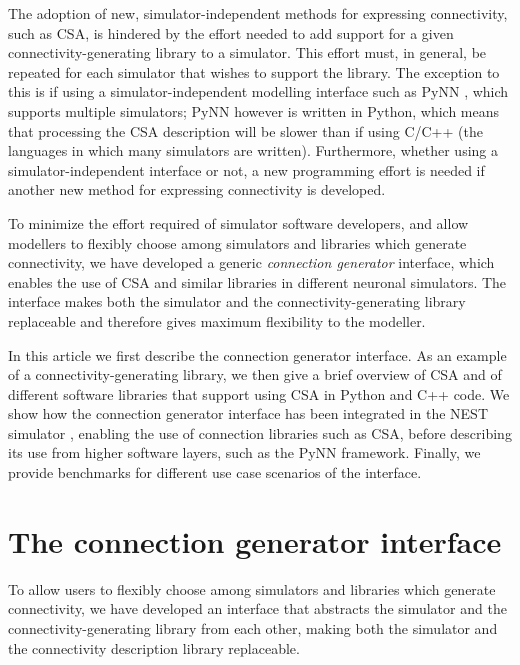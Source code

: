 \documentclass{frontiersSCNS} %
\begin{document}
The adoption of new, simulator-independent methods for expressing
connectivity, such as CSA, is hindered by the effort needed to add
support for a given connectivity-generating library to a simulator.
This effort must, in general, be repeated for each simulator that
wishes to support the library.  The exception to this is if using a
simulator-independent modelling interface such as PyNN
\citep[\url{http://www.neuralensemble.org/PyNN};][]{Davison09}, which
supports multiple simulators; PyNN however is written in Python, which
means that processing the CSA description will be slower than if using
C/C++ (the languages in which many simulators are written).
Furthermore, whether using a simulator-independent interface or not, a
new programming effort is needed if another new method for expressing
connectivity is developed.

To minimize the effort required of simulator software developers, and
allow modellers to flexibly choose among simulators and libraries
which generate connectivity, we have developed a generic
\emph{connection generator} interface, which enables the use of CSA
and similar libraries in different neuronal simulators.  The interface
makes both the simulator and the connectivity-generating library
replaceable and therefore gives maximum flexibility to the modeller.

In this article we first describe the connection generator interface.
As an example of a connectivity-generating library, we then give a
brief overview of CSA and of different software libraries that support
using CSA in Python and C++ code. We show how the connection generator
interface has been integrated in the NEST simulator
\citep[\url{http://www.nest-simulator.org};][]{Gewaltig_07_11204},
enabling the use of connection libraries such as CSA, before
describing its use from higher software layers, such as the PyNN
framework.  Finally, we provide benchmarks for different use case
scenarios of the interface.


\section{The connection generator interface}\label{sec:conn_gen}

To allow users to flexibly choose among simulators and libraries which
generate connectivity, we have developed an interface that abstracts the
simulator and the connectivity-generating library from each other,
making both the simulator and the connectivity description library
replaceable.
\end{document}
